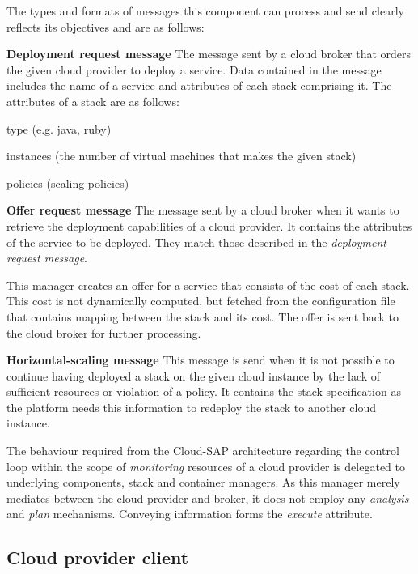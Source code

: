The types and formats of messages this component can process and send clearly reflects its objectives and are as follows:
\begin{asparaenum}
\item[\textbf{Deployment request message}] The message sent by a cloud broker that orders the given cloud provider to deploy a service. Data contained in the message includes the name of a service and attributes of each stack comprising it. The attributes of a stack are as follows:
  \begin{compactitem}
  \item type (e.g. java, ruby)
  \item instances (the number of virtual machines that makes the given stack)
  \item policies (scaling policies)
  \end{compactitem}
\item[\textbf{Offer request message}] The message sent by a cloud broker when it wants to retrieve the deployment capabilities of a cloud provider. It contains the attributes of the service to be deployed. They match those described in the \emph{deployment request message}.

  This manager creates an offer for a service that consists of the cost of each stack. This cost is not dynamically computed, but fetched from the configuration file that contains mapping between the stack and its cost. The offer is sent back to the cloud broker for further processing.
\item[\textbf{Horizontal-scaling message}] This message is send when it is not possible to continue having deployed a stack on the given cloud instance by the lack of sufficient resources or violation of a policy. It contains the stack specification as the platform needs this information to redeploy the stack to another cloud instance.
\end{asparaenum}

The behaviour required from the Cloud-SAP architecture regarding the control loop within the scope of \emph{monitoring} resources of a cloud provider is delegated to underlying components, stack and container managers. As this manager merely mediates between the cloud provider and broker, it does not employ any \emph{analysis} and \emph{plan} mechanisms. Conveying information forms the \emph{execute} attribute.

\subsection{Cloud provider client}


